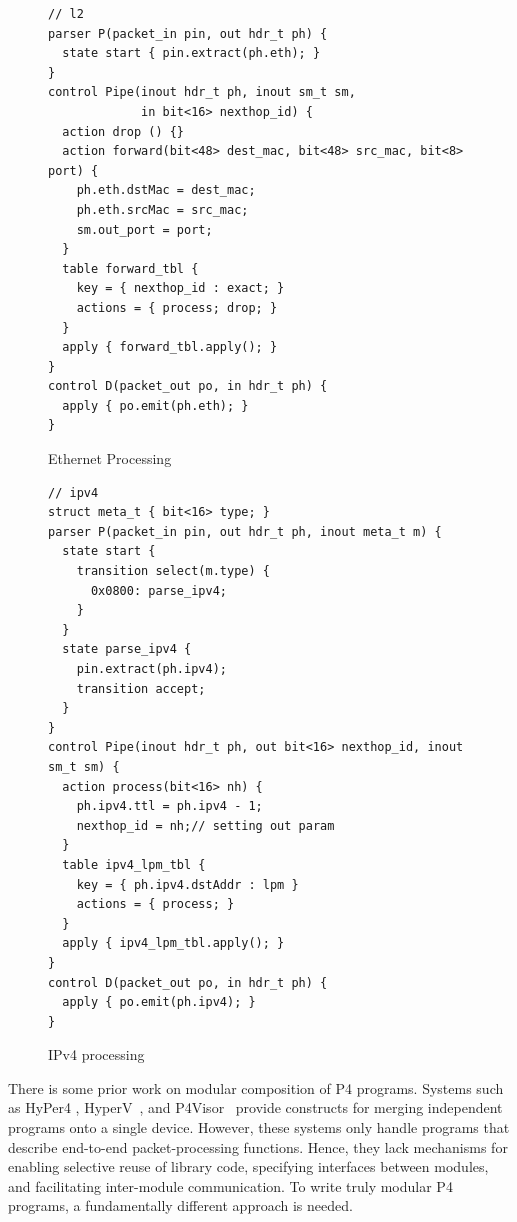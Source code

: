 \begin{figure}[ht]
\begin{lstlisting}[frame=none]
// l2
parser P(packet_in pin, out hdr_t ph) {
  state start { pin.extract(ph.eth); }
}
control Pipe(inout hdr_t ph, inout sm_t sm, 
             in bit<16> nexthop_id) {
  action drop () {}           
  action forward(bit<48> dest_mac, bit<48> src_mac, bit<8> port) {
    ph.eth.dstMac = dest_mac;
    ph.eth.srcMac = src_mac;
    sm.out_port = port;    
  }
  table forward_tbl {
    key = { nexthop_id : exact; } 
    actions = { process; drop; }
  }
  apply { forward_tbl.apply(); }
}
control D(packet_out po, in hdr_t ph) {
  apply { po.emit(ph.eth); }
}
\end{lstlisting}
\caption{Ethernet Processing}
\label{fig:l2.p4}
\end{figure}

\begin{figure}[ht]
\begin{lstlisting}[frame=none]
// ipv4
struct meta_t { bit<16> type; }
parser P(packet_in pin, out hdr_t ph, inout meta_t m) {
  state start {
    transition select(m.type) {
      0x0800: parse_ipv4; 
    }
  }
  state parse_ipv4 { 
    pin.extract(ph.ipv4); 
    transition accept; 
  }
}
control Pipe(inout hdr_t ph, out bit<16> nexthop_id, inout sm_t sm) {
  action process(bit<16> nh) {
    ph.ipv4.ttl = ph.ipv4 - 1;
    nexthop_id = nh;// setting out param
  }
  table ipv4_lpm_tbl {
    key = { ph.ipv4.dstAddr : lpm } 
    actions = { process; }
  }
  apply { ipv4_lpm_tbl.apply(); }
}
control D(packet_out po, in hdr_t ph) {
  apply { po.emit(ph.ipv4); }
}
\end{lstlisting}
\caption{IPv4 processing}
\label{fig:ipv4.p4}
\end{figure}


There is some prior work on modular composition of P4 programs.
Systems such as HyPer4 \cite{Hancock:2016:HUP:2999572.2999607},
HyperV~\cite{8038396}, and
P4Visor~\cite{Zheng:2018:PLV:3281411.3281436} provide constructs for
merging independent programs onto a single device. However, these
systems only handle programs that describe end-to-end
packet-processing functions. Hence, they lack mechanisms for enabling
selective reuse of library code, specifying interfaces between
modules, and facilitating inter-module communication. To write truly
modular P4 programs, a fundamentally different approach is needed.

